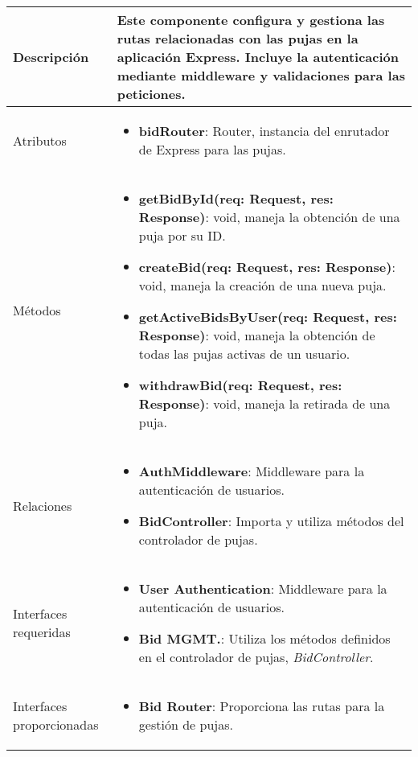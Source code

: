 \begin{longtable}{
    >{\columncolor{lightgreen!20}}p{4cm}
    p{12cm}
    }
    \midrule
    Descripción & Este componente configura y gestiona las rutas relacionadas con las pujas en la aplicación Express. Incluye la autenticación mediante middleware y validaciones para las peticiones. \\
    \midrule
    Atributos & \begin{itemize}[nosep,leftmargin=*]
      \item \textbf{bidRouter}: Router, instancia del enrutador de Express para las pujas.
    \end{itemize} \\
    \midrule
    Métodos & \begin{itemize}[nosep,leftmargin=*]
      \item \textbf{getBidById(req: Request, res: Response)}: void, maneja la obtención de una puja por su ID.
      \item \textbf{createBid(req: Request, res: Response)}: void, maneja la creación de una nueva puja.
      \item \textbf{getActiveBidsByUser(req: Request, res: Response)}: void, maneja la obtención de todas las pujas activas de un usuario.
      \item \textbf{withdrawBid(req: Request, res: Response)}: void, maneja la retirada de una puja.
    \end{itemize} \\
    \midrule
    Relaciones & \begin{itemize}[nosep,leftmargin=*]
      \item \textbf{AuthMiddleware}: Middleware para la autenticación de usuarios.
      \item \textbf{BidController}: Importa y utiliza métodos del controlador de pujas.
    \end{itemize} \\
    \midrule
    Interfaces requeridas & \begin{itemize}[nosep,leftmargin=*]
      \item \textbf{User Authentication}: Middleware para la autenticación de usuarios.
      \item \textbf{Bid MGMT.}: Utiliza los métodos definidos en el controlador de pujas, \textit{BidController}.
    \end{itemize} \\
    \midrule
    Interfaces proporcionadas & \begin{itemize}[nosep,leftmargin=*]
      \item \textbf{Bid Router}: Proporciona las rutas para la gestión de pujas.
    \end{itemize} \\
    \end{longtable}

